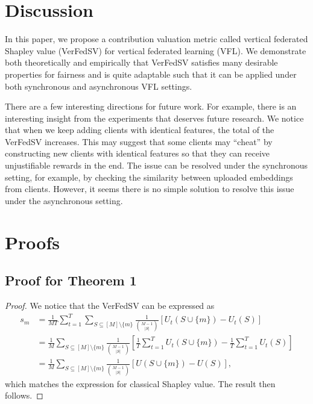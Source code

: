 \section{Discussion} \label{sec:8-9}
In this paper, we propose a contribution valuation metric called vertical federated Shapley value (VerFedSV) for vertical federated learning (VFL). We demonstrate both theoretically and empirically that VerFedSV satisfies many desirable properties for fairness and is quite adaptable such that it can be applied under both synchronous and asynchronous VFL settings. 

There are a few interesting directions for future work.  For example, there is an interesting insight from the experiments that deserves future research.  We notice that when we keep adding clients with identical features, the total of the VerFedSV increases. This may suggest that some clients may ``cheat'' by constructing new clients with identical features so that they can receive unjustifiable rewards in the end. The issue can be resolved under the synchronous setting, for example, by checking the similarity between uploaded embeddings from clients. However, it seems there is no simple solution to resolve this issue under the asynchronous setting. 

\section{Proofs} \label{sec:8-10}

\subsection{Proof for Theorem 1}
\begin{proof}
    We notice that the VerFedSV can be expressed as 
    \begin{align*}
        s_m &= \frac{1}{MT}\sum_{t=1}^T\sum_{S \subseteq [M] \setminus \{m\}} \frac{1}{\binom{M-1}{|S|}} [U_t(S\cup\{m\}) - U_t(S)]\\
        &= \frac{1}{M}\sum_{S \subseteq [M] \setminus \{m\}} \frac{1}{\binom{M-1}{|S|}} \left[\frac{1}{T}\sum_{t=1}^T U_t(S\cup\{m\}) - \frac{1}{T}\sum_{t=1}^T U_t(S)\right]\\
        &= \frac{1}{M}\sum_{S \subseteq [M] \setminus \{m\}} \frac{1}{\binom{M-1}{|S|}} \left[U(S\cup\{m\}) - U(S)\right],
    \end{align*}
    which matches the expression for classical Shapley value. The result then follows. 
\end{proof}

